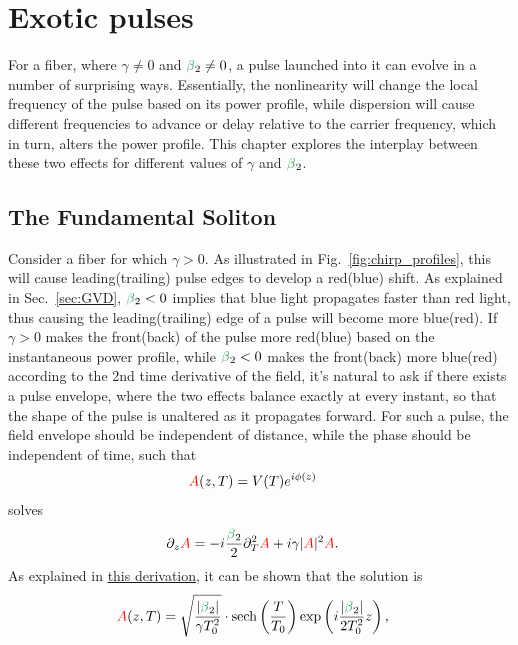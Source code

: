 \chapter{Exotic pulses}
\label{ch:Exotic}

For a fiber, where $\gamma\neq 0$ and $\betag_2\neq 0$, a pulse launched into it can evolve in a number of surprising ways. Essentially, the nonlinearity will change the local frequency of the pulse based on its power profile, while dispersion will cause different frequencies to advance or delay relative to the carrier frequency, which in turn, alters the power profile. This chapter explores the interplay between these two effects for different values of $\gamma$ and $\betag_2$. 


\section{The Fundamental Soliton}
\label{sec:soliton}
Consider a fiber for which $\gamma>0$. As illustrated in Fig.~\ref{fig:chirp_profiles}, this will cause leading(trailing) pulse edges to develop a red(blue) shift. As explained in Sec.~\ref{sec:GVD}, $\betag_2<0$ implies that blue light propagates faster than red light, thus causing the leading(trailing) edge of a pulse will become more blue(red). If $\gamma>0$ makes the front(back) of the pulse more red(blue) based on the instantaneous power profile, while $\betag_2<0$ makes the front(back) more blue(red) according to the 2nd time derivative of the field, it's natural to ask if there exists a pulse envelope, where the two effects balance exactly at every instant, so that the shape of the pulse is unaltered as it propagates forward. For such a pulse, the field envelope should be independent of distance, while the phase should be independent of time, such that
\begin{align}
    \textcolor{red}{A}(z,T) &= V(T)e^{i\phi(z)}
\end{align}
solves 
\begin{align}
\label{eq:NLSE_soliton}
    \partial_z\A &=  -i  \frac{\betag_2}{2}\partial_T^2\A+i\gamma|\A|^2\A.
\end{align}
As explained in \href{https://github.com/OleKrarup123/NLSE-vector-solver/blob/main/TutorialVideos/Soliton-Video/Fundamental_soliton_derivation.pdf}{this derivation}, it can be shown that the solution is
\begin{align}
    \A(z,T) &= \sqrt{\frac{|\betag_2|}{\gamma T_0^2}}\cdot\text{sech}\left(\frac{T}{T_0}\right)\exp\left(i\frac{|\betag_2|}{2T_0^2}z\right),
\end{align}
